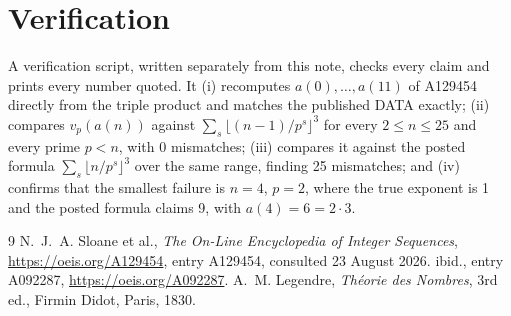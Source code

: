 \documentclass[11pt,a4paper]{article}
\theoremstyle{plain}
\theoremstyle{definition}
\begin{document}
\section{Verification}

A verification script, written separately from this note, checks every claim and prints
every number quoted. It (i) recomputes $a(0),\dots,a(11)$ of A129454 directly from the
triple product and matches the published DATA exactly; (ii) compares $v_{p}(a(n))$ against
$\sum_{s}\lfloor(n-1)/p^{s}\rfloor^{3}$ for every $2\le n\le25$ and every prime $p<n$, with
0 mismatches; (iii) compares it against the posted formula
$\sum_{s}\lfloor n/p^{s}\rfloor^{3}$ over the same range, finding 25 mismatches; and
(iv) confirms that the smallest failure is $n=4$, $p=2$, where the true exponent is 1 and
the posted formula claims 9, with $a(4)=6=2\cdot3$.

\begin{thebibliography}{9}
 N.~J.~A. Sloane et al., \emph{The On-Line Encyclopedia of Integer
Sequences}, \url{https://oeis.org/A129454}, entry A129454, consulted 23 August 2026.
 ibid., entry A092287, \url{https://oeis.org/A092287}.
 A.~M. Legendre, \emph{Th\'eorie des Nombres}, 3rd ed., Firmin Didot,
Paris, 1830.
\end{thebibliography}
\end{document}
